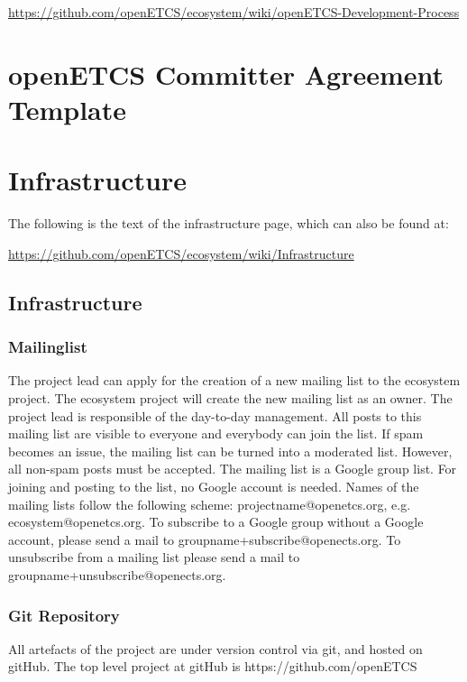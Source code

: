 \documentclass{template/openetcs_report}
\begin{document}
\url{https://github.com/openETCS/ecosystem/wiki/openETCS-Development-Process}



\chapter{openETCS Committer Agreement Template}
\label{app:committer-agreement}




\chapter{Infrastructure}
\label{app:infrastructure}

The following is the text of the infrastructure page, which can also be found at:

\url{https://github.com/openETCS/ecosystem/wiki/Infrastructure}

\section{Infrastructure}

\subsection{Mailinglist}

The project lead can apply for the creation of a new mailing list to the ecosystem project. The ecosystem project will create the new mailing list as an owner. The project lead is responsible of the day-to-day management. All posts to this mailing list are visible to everyone and everybody can join the list. If spam becomes an issue, the mailing list can be turned into a moderated list. However, all non-spam posts must be accepted. The mailing list is a Google group list. For joining and posting to the list, no Google account is needed. Names of the mailing lists follow the following scheme: projectname@openetcs.org, e.g. ecosystem@openetcs.org. To subscribe to a Google group without a Google account, please send a mail to groupname+subscribe@openects.org. To unsubscribe from a mailing list please send a mail to groupname+unsubscribe@openects.org.

\subsection{Git Repository}

All artefacts of the project are under version control via git, and hosted on gitHub. The top level project at gitHub is https://github.com/openETCS
\end{document}
